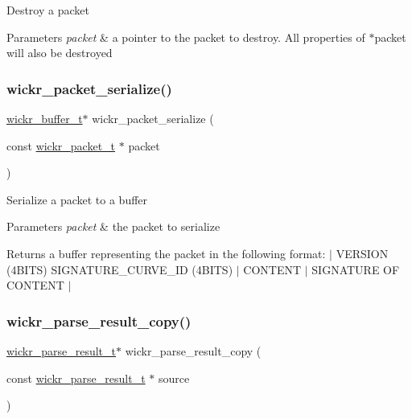Destroy a packet


\begin{DoxyParams}{Parameters}
{\em packet} & a pointer to the packet to destroy. All properties of \textquotesingle{}$\ast$packet\textquotesingle{} will also be destroyed \\
\hline
\end{DoxyParams}
\mbox{\label{group__wickr__protocol_gaa983fe863635b69d69d6d86d01443ecf}} 
\subsubsection{\texorpdfstring{wickr\_packet\_serialize()}{wickr\_packet\_serialize()}}
{\footnotesize\ttfamily \mbox{\hyperlink{structwickr__buffer}{wickr\+\_\+buffer\+\_\+t}}$\ast$ wickr\+\_\+packet\+\_\+serialize (\begin{DoxyParamCaption}\item[{const \mbox{\hyperlink{structwickr__packet}{wickr\+\_\+packet\+\_\+t}} $\ast$}]{packet }\end{DoxyParamCaption})}

Serialize a packet to a buffer


\begin{DoxyParams}{Parameters}
{\em packet} & the packet to serialize \\
\hline
\end{DoxyParams}
\begin{DoxyReturn}{Returns}
a buffer representing the packet in the following format\+: $\vert$ V\+E\+R\+S\+I\+ON (4B\+I\+TS) S\+I\+G\+N\+A\+T\+U\+R\+E\+\_\+\+C\+U\+R\+V\+E\+\_\+\+ID (4B\+I\+TS) $\vert$ C\+O\+N\+T\+E\+NT $\vert$ S\+I\+G\+N\+A\+T\+U\+RE OF C\+O\+N\+T\+E\+NT $\vert$ 
\end{DoxyReturn}
\mbox{\label{group__wickr__protocol_ga1671066ddc19b38ed05d4460d5a96706}} 
\subsubsection{\texorpdfstring{wickr\_parse\_result\_copy()}{wickr\_parse\_result\_copy()}}
{\footnotesize\ttfamily \mbox{\hyperlink{structwickr__parse__result}{wickr\+\_\+parse\+\_\+result\+\_\+t}}$\ast$ wickr\+\_\+parse\+\_\+result\+\_\+copy (\begin{DoxyParamCaption}\item[{const \mbox{\hyperlink{structwickr__parse__result}{wickr\+\_\+parse\+\_\+result\+\_\+t}} $\ast$}]{source }\end{DoxyParamCaption})}

